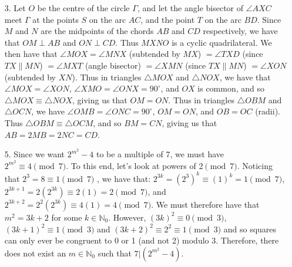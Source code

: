 \documentclass[a4paper,12pt]{article}
\begin{document}
\begin{enumerate}
    \item[3.] Let $O$ be the centre of the circle $\Gamma$, and let the angle
        bisector of $\angle AXC$ meet $\Gamma$ at the points $S$ on the arc
        $AC$, and the point $T$ on the arc $BD$.  Since $M$ and $N$
        are the midpoints of the chords $AB$ and $CD$ respectively, we have that
        $OM \perp AB$ and $ON \perp CD$. Thus $MXNO$ is a cyclic quadrilateral.
        We then have that $\angle MOX = \angle MNX$ (subtended by $MX$) $=
        \angle TXD$ (since $TX \parallel MN$) $= \angle MXT$ (angle bisector) $=
        \angle XMN$ (since $TX \parallel MN$) $= \angle XON$ (subtended by
        $XN$). Thus in triangles $\triangle MOX$ and $\triangle NOX$, we have that $\angle MOX =
        \angle XON$, $\angle XMO = \angle ONX = 90^\circ$, and $OX$ is common,
        and so $\triangle MOX \equiv \triangle NOX$, giving us that $OM = ON$.
        Thus in triangles $\triangle OBM$ and $\triangle OCN$, we have $\angle
        OMB = \angle ONC = 90^\circ$, $OM = ON$, and $OB = OC$ (radii). Thus
        $\triangle OBM \equiv \triangle OCM$, and so $BM = CN$, giving us that
        $AB = 2MB = 2NC = CD$.

    \item[5.] Since we want $2^{m^2}-4$ to be a multiple of 7, we must have $2^{m^2} \equiv 4 \pmod{7}$. To this end, let's look at powers of 2$\pmod{7}$. Noticing that $2^3=8\equiv 1 \pmod{7}$ , we have that: $2^{3k} = (2^3)^k \equiv (1)^k = 1 \pmod{7}$, $2^{3k+1} = 2(2^{3k}) \equiv 2(1) = 2 \pmod{7}$, and $2^{3k+2} = 2^2(2^{3k}) \equiv 4(1) = 4 \pmod{7}$. We must therefore have that $m^2 = 3k+2$ for some $k\in \mathbb{N}_0$. However, $(3k)^2\equiv 0 \pmod{3}$, $(3k+1)^2\equiv 1 \pmod{3}$ and $(3k+2)^2 \equiv 2^2 \equiv 1 \pmod{3}$ and so squares can only ever be congruent to 0 or 1 (and not 2) modulo 3. Therefore, there does not exist an $m\in \mathbb{N}_0$ such that $7|(2^{m^2}-4)$.
    
    
\end{enumerate}
\end{document}
